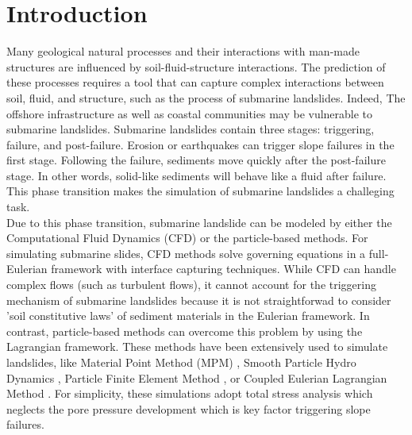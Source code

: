 \documentclass[preprint,12pt]{elsarticle}
\begin{document}
\newpage
%
\section{\textsf{Introduction}}

 Many geological natural processes and their interactions with man-made structures are influenced by soil-fluid-structure interactions. The prediction of these processes requires a tool that can capture complex interactions between soil, fluid, and structure, such as the process of submarine landslides. Indeed, The offshore infrastructure as well as coastal communities may be vulnerable to submarine landslides. Submarine landslides contain three stages: triggering, failure, and post-failure. Erosion or earthquakes can trigger slope failures in the first stage. Following the failure, sediments move quickly after the post-failure stage. In other words, solid-like sediments will behave like a fluid after failure. This phase transition makes the simulation of submarine landslides a challeging task.\\

Due to this phase transition, submarine landslide can be modeled by either the Computational Fluid Dynamics (CFD) or the particle-based methods. For simulating submarine slides, CFD methods solve governing equations in a full-Eulerian framework \cite{CFD1, CFD2,CFD3, CFD4} with interface capturing techniques. While CFD can handle complex flows (such as turbulent flows), it cannot account for the triggering mechanism of submarine landslides because it is not straightforwad to consider 'soil constitutive laws' of sediment materials in the Eulerian framework. In contrast, particle-based methods can overcome this problem by using the Lagrangian framework. These methods have been extensively used to simulate landslides, like Material Point Method (MPM) \cite{Tran2019}, Smooth Particle Hydro Dynamics \cite{Capone2010}, Particle Finite Element Method \cite{Zhang2019}, or Coupled Eulerian Lagrangian Method \cite{Dey2016}. For simplicity, these simulations adopt total stress analysis which neglects the pore pressure development which is key factor triggering slope failures. \\
\end{document}
